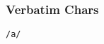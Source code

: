 \begin{frame}

\frametitle{Verbatim Chars}

\vspace{\fill}

\begin{center}

\Large\texttt{/a/}

\end{center}

\vspace{\fill}



\vspace{\fill}

\end{frame}
